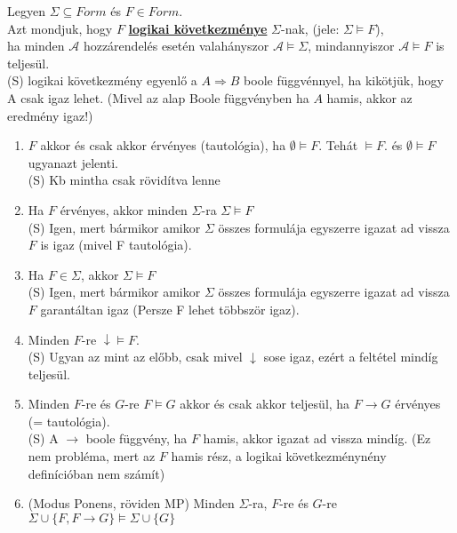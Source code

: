 \documentclass{beamer}
\newcommand{\mmedskip}{\vspace{0.5em}}
\begin{document}
\begin{frame}
\begin{tcolorbox}[title={Def.: Logikai következmény}]
Legyen $\Sigma \subseteq Form$ és $F \in Form$.\\
Azt mondjuk, hogy $F$ \underline{\textbf{logikai következménye}} $\Sigma$-nak, (jele: $\Sigma \models F$),\\
ha minden $\mathcal{A}$ hozzárendelés esetén valahányszor $\mathcal{A} \models \Sigma$, mindannyiszor $\mathcal{A} \models F$ is teljesül.\\
{\tiny (S) logikai következmény egyenlő a $A \Rightarrow B$ boole függvénnyel, ha kikötjük, hogy A csak igaz lehet. (Mivel az alap Boole függvényben ha $A$ hamis, akkor az eredmény igaz!)}
\end{tcolorbox}
\mmedskip
\begin{tcolorbox}[title={Ész}]
\begin{enumerate}
\item $F$ akkor és csak akkor érvényes (tautológia), ha $\emptyset \models F$. Tehát $\models F$. és $\emptyset \models F$ ugyanazt jelenti.\\
{\tiny (S) Kb mintha csak rövidítva lenne}\\
\item Ha $F$ érvényes, akkor minden $\Sigma$-ra $\Sigma \models F$\\
{\tiny (S) Igen, mert bármikor amikor $\Sigma$ összes formulája egyszerre igazat ad vissza $F$ is igaz (mivel F tautológia).}\\
\item Ha $F \in \Sigma$, akkor $\Sigma \models F$\\
{\tiny (S) Igen, mert bármikor amikor $\Sigma$ összes formulája egyszerre igazat ad vissza $F$ garantáltan igaz (Persze F lehet többször igaz).}\\
\item Minden $F$-re $\downarrow \models F$.\\
{\tiny (S) Ugyan az mint az előbb, csak mivel $\downarrow$ sose igaz, ezért a feltétel mindíg teljesül.}\\
\item Minden $F$-re és $G$-re $F \models G$ akkor és csak akkor teljesül, ha $F \rightarrow G$ érvényes (= tautológia).\\
{\tiny (S) A $\rightarrow$ boole függvény, ha $F$ hamis, akkor igazat ad vissza mindíg. (Ez nem probléma, mert az $F$ hamis rész, a logikai következménynény definícióban nem számít)}\\
\item (Modus Ponens, röviden MP) Minden $\Sigma$-ra, $F$-re és $G$-re $\Sigma \cup \{F, F \rightarrow G\} \models \Sigma \cup \{G\}$\\

\end{enumerate}
\end{tcolorbox}
\end{frame}
\end{document}
